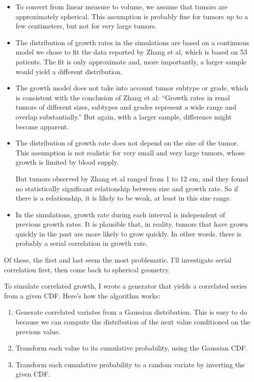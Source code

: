 \documentclass[12pt]{book}
\begin{document}
\begin{itemize}

\item To convert from linear measure to volume, we assume that
  tumors are approximately spherical.  This assumption is probably
  fine for tumors up to a few centimeters, but not for very
  large tumors.

\item The distribution of growth rates in the simulations are based on
  a continuous model we chose to fit the data reported by Zhang et al,
  which is based on 53 patients.  The fit is only approximate and, more
  importantly, a larger sample would yield a
  different distribution.

\item The growth model does not take into account tumor subtype or
  grade, which is consistent with the conclusion of Zhang et al:
  ``Growth rates in renal tumors of different sizes, subtypes and
  grades represent a wide range and overlap substantially.''
  But again, with a larger sample, difference might become apparent.

\item The distribution of growth rate does not depend on the size of
  the tumor.  This assumption is not realistic for very
  small and very large tumors, whose growth is limited by blood supply.

  But tumors observed by Zhang et al ranged from 1 to 12 cm, and they
  found no statistically significant relationship between
  size and growth rate.  So if there is a relationship, it is
  likely to be weak, at least in this size range.
  
\item In the simulations, growth rate during each interval is
  independent of previous growth rates.  It is plausible that, in
  reality, tumors that have grown quickly in the past are more likely
  to grow quickly.  In other words, there is probably
  a serial correlation in growth rate.

\end{itemize}

Of these, the first and last seem the most problematic.  I'll
investigate serial correlation first, then come back to
spherical geometry.

To simulate correlated growth, I wrote a generator that yields
a correlated series from a given CDF.
Here's how the algorithm works:

\begin{enumerate}

\item Generate correlated variates from a Gaussian distribution.
  This is easy to do because we can compute the distribution
  of the next value conditioned on the previous value.

\item Transform each value to its cumulative probability, using
  the Gaussian CDF.

\item Transform each cumulative probability to a random variate
  by inverting the given CDF.

\end{enumerate}
\end{document}
